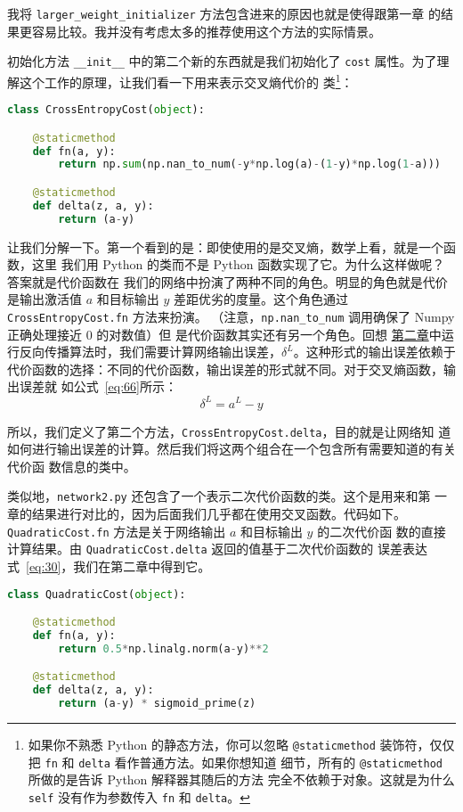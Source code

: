 我将 \lstinline!larger_weight_initializer! 方法包含进来的原因也就是使得跟第一章
的结果更容易比较。我并没有考虑太多的推荐使用这个方法的实际情景。

初始化方法 \lstinline!__init__! 中的第二个新的东西就是我们初始化了
\lstinline!cost! 属性。为了理解这个工作的原理，让我们看一下用来表示交叉熵代价的
类\footnote{如果你不熟悉 Python 的静态方法，你可以忽略 \lstinline!@staticmethod!
  装饰符，仅仅把 \lstinline!fn! 和 \lstinline!delta! 看作普通方法。如果你想知道
  细节，所有的 \lstinline!@staticmethod! 所做的是告诉 Python 解释器其随后的方法
  完全不依赖于对象。这就是为什么 \lstinline!self! 没有作为参数传入
  \lstinline!fn!  和 \lstinline!delta!。}：
\begin{lstlisting}[language=Python]
class CrossEntropyCost(object):

    @staticmethod
    def fn(a, y):
        return np.sum(np.nan_to_num(-y*np.log(a)-(1-y)*np.log(1-a)))

    @staticmethod
    def delta(z, a, y):
        return (a-y)
\end{lstlisting}

让我们分解一下。第一个看到的是：即使使用的是交叉熵，数学上看，就是一个函数，这里
我们用 Python 的类而不是 Python 函数实现了它。为什么这样做呢？答案就是代价函数在
我们的网络中扮演了两种不同的角色。明显的角色就是代价是输出激活值 $a$ 和目标输出
$y$ 差距优劣的度量。这个角色通过 \lstinline!CrossEntropyCost.fn! 方法来扮演。
（注意，\lstinline!np.nan_to_num! 调用确保了 Numpy 正确处理接近 $0$ 的对数值）但
是代价函数其实还有另一个角色。回想%
\hyperref[sec:the_four_fundamental_equations_behind_backpropagation]{第二章}中运
行反向传播算法时，我们需要计算网络输出误差，$\delta^L$。这种形式的输出误差依赖于
代价函数的选择：不同的代价函数，输出误差的形式就不同。对于交叉熵函数，输出误差就
如公式~\eqref{eq:66}所示：
\begin{equation}
  \delta^L = a^L-y
  \label{eq:99}\tag{99}
\end{equation}

所以，我们定义了第二个方法，\lstinline!CrossEntropyCost.delta!，目的就是让网络知
道如何进行输出误差的计算。然后我们将这两个组合在一个包含所有需要知道的有关代价函
数信息的类中。

类似地，\lstinline!network2.py! 还包含了一个表示二次代价函数的类。这个是用来和第
一章的结果进行对比的，因为后面我们几乎都在使用交叉函数。代码如下。
\lstinline!QuadraticCost.fn! 方法是关于网络输出 $a$ 和目标输出 $y$ 的二次代价函
数的直接计算结果。由 \lstinline!QuadraticCost.delta! 返回的值基于二次代价函数的
误差表达式~\eqref{eq:30}，我们在第二章中得到它。
\begin{lstlisting}[language=Python]
class QuadraticCost(object):

    @staticmethod
    def fn(a, y):
        return 0.5*np.linalg.norm(a-y)**2

    @staticmethod
    def delta(z, a, y):
        return (a-y) * sigmoid_prime(z)
\end{lstlisting}


